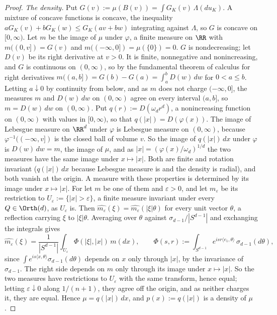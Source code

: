 \begin{proof}
\emph{The density.} Put $G(v) := \mu(B(v)) = \int G_K(v)\,\Lambda(du_K)$. A mixture of concave
functions is concave, the inequality $aG_K(v) + bG_K(w) \le G_K(av + bw)$ integrating against
$\Lambda$, so $G$ is concave on $[0,\infty)$. Let $m$ be the image of $\mu$ under $\varphi$, a
finite measure on $\RR$ with $m((0,v]) = G(v)$ and $m((-\infty,0]) = \mu(\{0\}) = 0$. $G$ is
nondecreasing; let $D(v)$ be its right derivative at $v > 0$. It is finite, nonnegative and
nonincreasing, and $G$ is continuous on $(0,\infty)$, so by the fundamental theorem of calculus
for right derivatives $m((a,b]) = G(b) - G(a) = \int_a^b D(w)\,dw$ for $0 < a \le b$. Letting
$a \downarrow 0$ by continuity from below, and as $m$ does not charge $(-\infty,0]$, the measures
$m$ and $D(w)\,dw$ on $(0,\infty)$ agree on every interval $(a,b]$, so $m = D(w)\,dw$ on
$(0,\infty)$. Put $q(r) := D(\omega_d r^d)$, a nonincreasing function on $(0,\infty)$ with values
in $[0,\infty)$, so that $q(|x|) = D(\varphi(x))$. The image of Lebesgue measure on $\RR^d$ under
$\varphi$ is Lebesgue measure on $(0,\infty)$, because $\varphi^{-1}((-\infty,v])$ is the closed
ball of volume $v$. So the image of $q(|x|)\,dx$ under $\varphi$ is $D(w)\,dw = m$, the image of
$\mu$, and as $|x| = (\varphi(x)/\omega_d)^{1/d}$ the two measures have the same image under
$x \mapsto |x|$. Both are finite and rotation invariant ($q(|x|)\,dx$ because Lebesgue measure is and
the density is radial), and both vanish at the origin. A measure with these properties is
determined by its image under $x \mapsto |x|$. For let $m$ be one of them and
$\varepsilon > 0$, and let $m_\varepsilon$ be its restriction to
$U_\varepsilon := \{|x| > \varepsilon\}$, a finite measure invariant under every $Q \in \Orth(d)$,
as $U_\varepsilon$ is. Then $\widehat{m_\varepsilon}(\xi) = \widehat{m_\varepsilon}(|\xi|\theta)$
for every unit vector $\theta$, a reflection carrying $\xi$ to $|\xi|\theta$. Averaging over
$\theta$ against $\sigma_{d-1}/|S^{d-1}|$ and exchanging the integrals gives
\[
  \widehat{m_\varepsilon}(\xi)
   = \frac{1}{|S^{d-1}|}\int_{U_\varepsilon}\Phi(|\xi|,|x|)\,m(dx) ,
  \qquad
  \Phi(s,r) := \int_{S^{d-1}} e^{i s r\langle e_1,\theta\rangle}\,\sigma_{d-1}(d\theta) ,
\]
since $\int e^{i s\langle x,\theta\rangle}\sigma_{d-1}(d\theta)$ depends on $x$ only through $|x|$,
by the invariance of $\sigma_{d-1}$. The right side depends on $m$ only through its image under
$x \mapsto |x|$. So the two measures have restrictions to $U_\varepsilon$ with the same transform,
hence equal; letting $\varepsilon \downarrow 0$ along $1/(n+1)$, they agree off the origin, and as
neither charges it, they are equal. Hence $\mu = q(|x|)\,dx$, and $p(x) := q(|x|)$ is a density of
$\mu$.


\end{proof}
